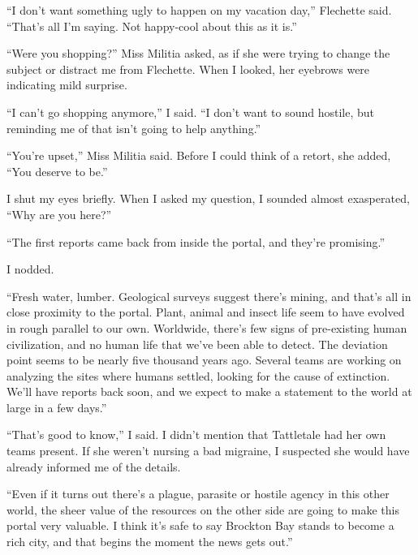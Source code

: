 ``I don't want something ugly to happen on my vacation day,'' Flechette said.  ``That's all I'm saying.  Not happy-cool about this as it is.''



``Were you shopping?'' Miss Militia asked, as if she were trying to change the subject or distract me from Flechette.  When I looked, her eyebrows were indicating mild surprise.



``I can't go shopping anymore,'' I said.  ``I don't want to sound hostile, but reminding me of that isn't going to help anything.''



``You're upset,'' Miss Militia said.  Before I could think of a retort, she added, ``You deserve to be.''



I shut my eyes briefly.  When I asked my question, I sounded almost exasperated, ``Why are you here?''



``The first reports came back from inside the portal, and they're promising.''



I nodded.



``Fresh water, lumber.  Geological surveys suggest there's mining, and that's all in close proximity to the portal.  Plant, animal and insect life seem to have evolved in rough parallel to our own.  Worldwide, there's few signs of pre-existing human civilization, and no human life that we've been able to detect.  The deviation point seems to be nearly five thousand years ago.  Several teams are working on analyzing the sites where humans settled, looking for the cause of extinction.  We'll have reports back soon, and we expect to make a statement to the world at large in a few days.''



``That's good to know,'' I said.  I didn't mention that Tattletale had her own teams present.  If she weren't nursing a bad migraine, I suspected she would have already informed me of the details.



``Even if it turns out there's a plague, parasite or hostile agency in this other world, the sheer value of the resources on the other side are going to make this portal very valuable.  I think it's safe to say Brockton Bay stands to become a rich city, and that begins the moment the news gets out.''



